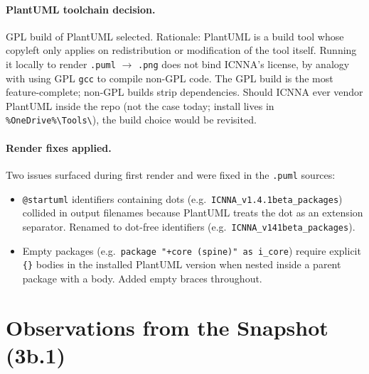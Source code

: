 \documentclass[11pt,a4paper]{article}
\begin{document}
\paragraph{PlantUML toolchain decision.} GPL build of PlantUML
selected. Rationale: PlantUML is a build tool whose copyleft only
applies on redistribution or modification of the tool itself. Running
it locally to render \texttt{.puml} $\to$ \texttt{.png} does not bind
ICNNA's license, by analogy with using GPL \texttt{gcc} to compile
non-GPL code. The GPL build is the most feature-complete; non-GPL
builds strip dependencies. Should ICNNA ever vendor PlantUML inside
the repo (not the case today; install lives in
\texttt{\%OneDrive\%\textbackslash Tools\textbackslash}), the build
choice would be revisited.

\paragraph{Render fixes applied.} Two issues surfaced during first
render and were fixed in the \texttt{.puml} sources:
\begin{itemize}[nosep]
    \item \texttt{@startuml} identifiers containing dots (e.g.\ \texttt{ICNNA\_v1.4.1beta\_packages}) collided in output filenames because PlantUML treats the dot as an extension separator. Renamed to dot-free identifiers (e.g.\ \texttt{ICNNA\_v141beta\_packages}).
    \item Empty packages (e.g.\ \texttt{package "+core (spine)" as i\_core}) require explicit \texttt{\{\}} bodies in the installed PlantUML version when nested inside a parent package with a body. Added empty braces throughout.
\end{itemize}

\section{Observations from the Snapshot (3b.1)}
\end{document}
